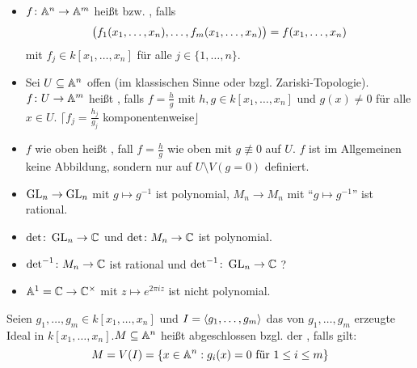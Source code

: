 \begin{defn}
	\begin{itemize}
		\item $f \colon \aff^n \rightarrow \aff^m$ heißt  bzw. , falls
		\[ \enbrace[\big]{f_1(x_1,\dots,x_n),\dots,f_m(x_1,\dots,x_n)} = f(x_1,\dots,x_n) \]
		mit $f_j \in k[x_1,\dots,x_n]$ für alle $j \in \{1,\dots,n\}$.   
		\item Sei $U \subseteq \aff^n$ offen (im klassischen Sinne oder bzgl. Zariski-Topologie). $f\colon U \rightarrow \aff^m$ heißt , falls 
		$f = \frac{h}{g}$ mit $h,g \in k[x_1,\dots,x_n]$ und $g(x) \neq 0$ für alle $x \in U$. \hfill $\lceil f_j = \frac{h_j}{g_j}$ komponentenweise$\rfloor$
		\item $f$ wie oben heißt , fall $f = \frac{h}{g}$ wie oben mit $g \not\equiv 0$ auf $U$. $f$ ist im Allgemeinen keine Abbildung, sondern nur 
		auf $U \setminus V(g = 0)$ definiert. 
	\end{itemize}
\end{defn}

\begin{bsp}
	\begin{itemize}
		\item $\GL_n \rightarrow \GL_n$ mit $g \mapsto g^{-1}$ ist polynomial, $M_n \rightarrow M_n$ mit \enquote{$g \mapsto g^{-1}$} ist rational.
		\item $\det\colon \GL_n \rightarrow \CC$ und $\det\colon M_n \rightarrow \CC$ ist polynomial.
		\item $\det^{-1}\colon M_n \rightarrow \CC$ ist rational und  $\det^{-1}\colon \GL_n \rightarrow \CC$ ?
		\item $\aff^1 = \CC \rightarrow \CC^\times$ mit $z \mapsto e^{2\pi i z}$ ist nicht polynomial.
	\end{itemize}
\end{bsp}

\begin{defn} \label{1.3}
	Seien $g_1,\dots,g_m \in k[x_1,\dots,x_n]$ und $I = \sprod{g_1,\dots,g_m}$ das von $g_1,\dots,g_m$ erzeugte Ideal in $k[x_1,\dots,x_n]$.\linebreak $M \subseteq \aff^n$ heißt abgeschlossen bzgl. der , falls gilt:
	\[ M = V(I) = \{x \in \aff^n : g_i(x) = 0 \text{ für } 1 \leq i \leq m \}\]
\end{defn}


